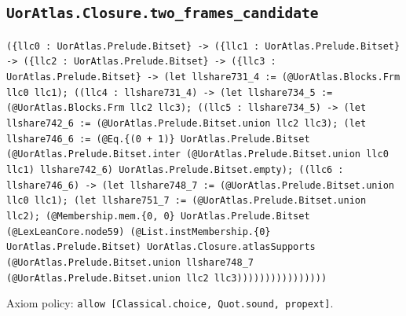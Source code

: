 \documentclass[11pt]{article}
\begin{document}
\subsection*{\texttt{UorAtlas.Closure.two\_frames\_candidate}}
\noindent\texttt{(\{llc0 : UorAtlas.Prelude.Bitset\} -> (\{llc1 : UorAtlas.Prelude.Bitset\} -> (\{llc2 : UorAtlas.Prelude.Bitset\} -> (\{llc3 : UorAtlas.Prelude.Bitset\} -> (let llshare731\_4 := (@UorAtlas.Blocks.Frm llc0 llc1); ((llc4 : llshare731\_4) -> (let llshare734\_5 := (@UorAtlas.Blocks.Frm llc2 llc3); ((llc5 : llshare734\_5) -> (let llshare742\_6 := (@UorAtlas.Prelude.Bitset.union llc2 llc3); (let llshare746\_6 := (@Eq.\{(0 + 1)\} UorAtlas.Prelude.Bitset (@UorAtlas.Prelude.Bitset.inter (@UorAtlas.Prelude.Bitset.union llc0 llc1) llshare742\_6) UorAtlas.Prelude.Bitset.empty); ((llc6 : llshare746\_6) -> (let llshare748\_7 := (@UorAtlas.Prelude.Bitset.union llc0 llc1); (let llshare751\_7 := (@UorAtlas.Prelude.Bitset.union llc2); (@Membership.mem.\{0, 0\} UorAtlas.Prelude.Bitset (@LexLeanCore.node59) (@List.instMembership.\{0\} UorAtlas.Prelude.Bitset) UorAtlas.Closure.atlasSupports (@UorAtlas.Prelude.Bitset.union llshare748\_7 (@UorAtlas.Prelude.Bitset.union llc2 llc3))))))))))))))))}\par
\noindent Axiom policy: \texttt{allow [Classical.choice, Quot.sound, propext]}.\par
\end{document}
